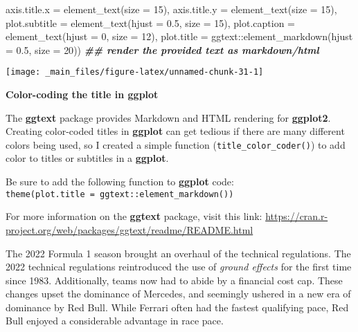 \documentclass[
]{book}
\newenvironment{Shaded}{\begin{snugshade}}{\end{snugshade}}
\newcommand{\AttributeTok}[1]{\textcolor[rgb]{0.77,0.63,0.00}{#1}}
\newcommand{\DecValTok}[1]{\textcolor[rgb]{0.00,0.00,0.81}{#1}}
\newcommand{\DocumentationTok}[1]{\textcolor[rgb]{0.56,0.35,0.01}{\textbf{\textit{#1}}}}
\newcommand{\FloatTok}[1]{\textcolor[rgb]{0.00,0.00,0.81}{#1}}
\newcommand{\FunctionTok}[1]{\textcolor[rgb]{0.00,0.00,0.00}{#1}}
\newcommand{\NormalTok}[1]{#1}
\newcommand{\SpecialCharTok}[1]{\textcolor[rgb]{0.00,0.00,0.00}{#1}}
\begin{document}
\begin{Shaded}
\begin{Highlighting}[]
        \AttributeTok{axis.title.x =} \FunctionTok{element\_text}\NormalTok{(}\AttributeTok{size =} \DecValTok{15}\NormalTok{),}
        \AttributeTok{axis.title.y =} \FunctionTok{element\_text}\NormalTok{(}\AttributeTok{size =} \DecValTok{15}\NormalTok{),}
         \AttributeTok{plot.subtitle =} \FunctionTok{element\_text}\NormalTok{(}\AttributeTok{hjust =} \FloatTok{0.5}\NormalTok{, }\AttributeTok{size =} \DecValTok{15}\NormalTok{),}
         \AttributeTok{plot.caption =} \FunctionTok{element\_text}\NormalTok{(}\AttributeTok{hjust =} \DecValTok{0}\NormalTok{, }\AttributeTok{size =} \DecValTok{12}\NormalTok{),}
        \AttributeTok{plot.title =}\NormalTok{ ggtext}\SpecialCharTok{::}\FunctionTok{element\_markdown}\NormalTok{(}\AttributeTok{hjust =} \FloatTok{0.5}\NormalTok{, }\AttributeTok{size =} \DecValTok{20}\NormalTok{)) }\DocumentationTok{\#\# render the provided text as markdown/html}
\end{Highlighting}
\end{Shaded}

\begin{center}\texttt{[image: \_main\_files/figure-latex/unnamed-chunk-31-1]} \end{center}

\begin{blackbox}

\begin{center}
\textbf{Color-coding the title in ggplot}

\end{center}

The \textbf{ggtext} package provides Markdown and HTML rendering for \textbf{ggplot2}. Creating color-coded titles in \textbf{ggplot} can get tedious if there are many different colors being used, so I created a simple function (\texttt{title\_color\_coder()}) to add color to titles or subtitles in a \textbf{ggplot}.

Be sure to add the following function to \textbf{ggplot} code: \texttt{theme(plot.title\ =\ ggtext::element\_markdown())}

For more information on the \textbf{ggtext} package, visit this link: \url{https://cran.r-project.org/web/packages/ggtext/readme/README.html}

\end{blackbox}

The 2022 Formula 1 season brought an overhaul of the technical regulations. The 2022 technical regulations reintroduced the use of \emph{ground effects} for the first time since 1983. Additionally, teams now had to abide by a financial cost cap. These changes upset the dominance of Mercedes, and seemingly ushered in a new era of dominance by Red Bull. While Ferrari often had the fastest qualifying pace, Red Bull enjoyed a considerable advantage in race pace.
\end{document}
